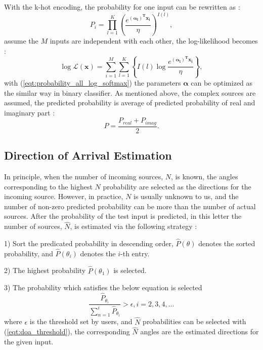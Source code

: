 \documentclass[journal]{IEEEtran}
\begin{document}
With the k-hot encoding, the probability for one input can be rewritten as :
\begin{equation} \label{eqt:k_hot_encoding_probability}
P_{i} = \prod_{l=1}^{K} \left ( \frac{e^{  \boldsymbol{(\alpha_{l})^{T}x_{i}} }}{\eta}  \right )^{I(l)},
\end{equation}
assume the $M$ inputs are independent with each other, the log-likelihood becomes :
\begin{equation} \label{eqt:probability_all_log_softmax} 
\log\mathcal{L}(\boldsymbol{x}) =  \sum_{i=1}^{M} \sum_{l=1}^{K} \left \{ I(l) \log  \frac{e^{  \boldsymbol{(\alpha_{l})^{T}x_{i}} }}{\eta}  \right \},
\end{equation}
with (\ref{eqt:probability_all_log_softmax}) the parameters $\boldsymbol{\alpha}$ can be optimized as the similar way in binary classifier. 
As mentioned above, the complex sources are assumed, the predicted probability is average of predicted probability of real and imaginary part :
\begin{equation} \label{eqt:probability_real_and_imag_softmax} 
P = \frac{P_{real} + P_{imag}}{2}.  
\end{equation}
\subsection{Direction of Arrival Estimation}
In principle, when the number of incoming sources, $N$, is known, the angles corresponding to the highest $N$ probability are selected as the directions for the incoming source. However, in practice, $N$ is usually unknown to us, and the number of non-zero predicted probability can be more than the number of actual sources. 
After the probability of the test input is predicted, in this letter the number of sources, $\widehat{N}$, is estimated via the following strategy :

1) Sort the predicated probability in descending order, $\widehat{P}(\theta)$ denotes the sorted probability, and $\widehat{P}(\theta_{i})$ denotes the $i$-th entry.

2) The highest probability $\widehat{P}(\theta_{1})$ is selected. 

3) The probability which satisfies the below equation is selected 
\begin{equation} \label{eqt:doa_threshold} 
\frac{\widehat{P}_{\theta_{i}}}{\sum_{n=1}^{i}\widehat{P}_{\theta_{i}}} > \epsilon, i = 2,3,4,...
\end{equation}
where $\epsilon$ is the threshold set by users, and $\widehat{N}$ probabilities can be selected with (\ref{eqt:doa_threshold}), the corresponding $\widehat{N}$ angles are the estimated directions for the given input. 
\end{document}

